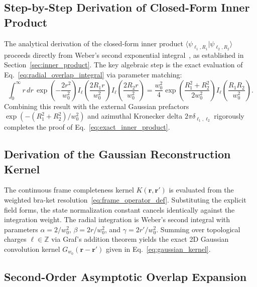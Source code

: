 \documentclass[11pt,a4paper]{article}
\begin{document}
\subsection{Step-by-Step Derivation of Closed-Form Inner Product}

The analytical derivation of the closed-form inner product $\langle \psi_{\ell_1, R_1} | \psi_{\ell_2, R_2} \rangle$ proceeds directly from Weber's second exponential integral~\cite{Gradshteyn2014}, as established in Section~\ref{sec:inner_product}. The key algebraic step is the exact evaluation of Eq.~\eqref{eq:radial_overlap_integral} via parameter matching:
\begin{equation}
\int_0^\infty r \, dr \, \exp\left( - \frac{2 r^2}{w_0^2} \right) I_\ell\left( \frac{2 R_1 r}{w_0^2} \right) I_\ell\left( \frac{2 R_2 r}{w_0^2} \right) = \frac{w_0^2}{4} \exp\left( \frac{R_1^2 + R_2^2}{2 w_0^2} \right) I_\ell\left( \frac{R_1 R_2}{w_0^2} \right).
\label{eq:app_weber_evaluated}
\end{equation}
Combining this result with the external Gaussian prefactors $\exp(-(R_1^2 + R_2^2)/w_0^2)$ and azimuthal Kronecker delta $2\pi \delta_{\ell_1, \ell_2}$ rigorously completes the proof of Eq.~\eqref{eq:exact_inner_product}.

\subsection{Derivation of the Gaussian Reconstruction Kernel}

The continuous frame completeness kernel $K(\mathbf{r}, \mathbf{r}')$ is evaluated from the weighted bra-ket resolution~\eqref{eq:frame_operator_def}. Substituting the explicit field forms, the state normalization constant cancels identically against the integration weight. The radial integration is Weber's second integral with parameters $\alpha = 2/w_0^2$, $\beta = 2r/w_0^2$, and $\gamma = 2r'/w_0^2$. Summing over topological charges $\ell \in \mathbb{Z}$ via Graf's addition theorem yields the exact 2D Gaussian convolution kernel $G_{w_0}(\mathbf{r} - \mathbf{r}')$ given in Eq.~\eqref{eq:gaussian_kernel}.

\subsection{Second-Order Asymptotic Overlap Expansion}
\end{document}

